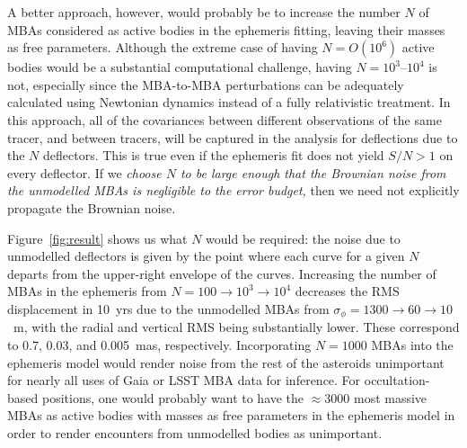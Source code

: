 \documentclass[linenumbers, onecolumn]{aastex631}
\begin{document}
A better approach, however, would probably be to increase the number $N$ of MBAs considered as active bodies in the ephemeris fitting, leaving their masses as free parameters.  Although the extreme case of having $N=O(10^6)$ active bodies would be a substantial computational challenge, having $N=10^3$--$10^4$ is not, especially since the MBA-to-MBA perturbations can be adequately calculated using Newtonian dynamics instead of a fully relativistic treatment.  In this approach, all of the covariances between different observations of the same tracer, and between tracers, will be captured in the analysis for deflections due to the $N$ deflectors.  This is true even if the ephemeris fit does not yield $S/N>1$ on every deflector.  If we \emph{choose $N$ to be large enough that the Brownian noise from the unmodelled MBAs is negligible to the error budget,} then we need not explicitly propagate the Brownian noise.

Figure~\ref{fig:result} shows us what $N$ would be required: the noise due to unmodelled deflectors is given by the point where each curve for a given $N$ departs from the upper-right envelope of the curves.   Increasing the number of MBAs in the ephemeris from $N=100\rightarrow10^3\rightarrow10^4$ decreases the RMS displacement in 10~yrs due to the unmodelled MBAs from $\sigma_\phi=1300\rightarrow60\rightarrow10$~m, with the radial and vertical RMS being substantially lower.  These correspond to 0.7, 0.03, and 0.005~mas, respectively.  Incorporating $N=1000$ MBAs into the ephemeris model would render noise from the rest of the asteroids unimportant for nearly all uses of Gaia or LSST MBA data for inference.  For occultation-based positions, one would probably want to have the $\approx3000$ most massive MBAs as active bodies with masses as free parameters in the ephemeris model in order to render encounters from unmodelled bodies as unimportant.
\end{document}
